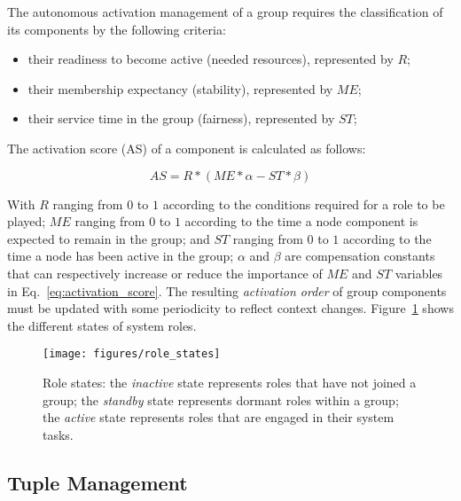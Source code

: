 
The autonomous activation management of a group requires the classification of its components by the following criteria:

\begin{itemize}

\item their readiness to become active (needed resources), represented by $R$;

\item their membership expectancy (stability), represented by $ME$; 

\item their service time in the group (fairness), represented by $ST$;

\end{itemize}

The activation score (AS) of a component is calculated as follows:

\begin{equation}
AS = R * (ME * \alpha - ST * \beta)
\end{equation}\label{eq:activation_score}

With $R$ ranging from $0$ to $1$ according to the conditions required for a role to be played; $ME$ ranging from $0$ to $1$ according to the time a node component is expected to remain in the group; and $ST$ ranging from $0$ to $1$ according to the time a node has been active in the group; $\alpha$ and $\beta$ are compensation constants that can respectively increase or reduce the importance of $ME$ and $ST$ variables in Eq.~\ref{eq:activation_score}. The resulting \textit{activation order} of group components must be updated with some periodicity to reflect context changes. Figure~\ref{fig:role_states} shows the different states of system roles.

\begin{figure}[t!]
	\centering
	\texttt{[image: figures/role\_states]}
	\caption{Role states: the \textit{inactive} state represents roles that have not joined a group; the \textit{standby} state represents dormant roles within a group; the \textit{active} state represents roles that are engaged in their system tasks.}
	\label{fig:role_states}
\end{figure}

\subsection{Tuple Management}

